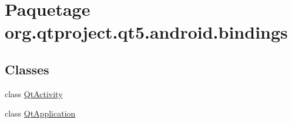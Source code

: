 \hypertarget{namespaceorg_1_1qtproject_1_1qt5_1_1android_1_1bindings}{\section{Paquetage org.\-qtproject.\-qt5.\-android.\-bindings}
\label{namespaceorg_1_1qtproject_1_1qt5_1_1android_1_1bindings}
}
\subsection*{Classes}
\begin{DoxyCompactItemize}
\item 
class \hyperlink{classorg_1_1qtproject_1_1qt5_1_1android_1_1bindings_1_1_qt_activity}{Qt\-Activity}
\item 
class \hyperlink{classorg_1_1qtproject_1_1qt5_1_1android_1_1bindings_1_1_qt_application}{Qt\-Application}
\end{DoxyCompactItemize}
